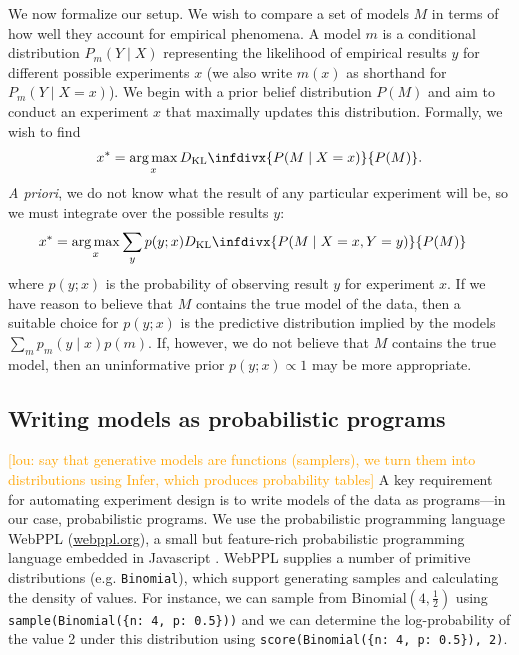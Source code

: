 \documentclass{article}
\newcommand{\dkl}{D_\mathrm{KL}\infdivx}
\newcommand{\lou}[1]{\textcolor{orange}{[lou: #1]}}
\DeclareMathOperator*{\argmax}{arg\,max}
\begin{document}
We now formalize our setup.
We wish to compare a set of models $M$ in terms of how well they account for empirical phenomena.
A model $m$ is a conditional distribution $P_m(Y \mid X)$ representing the likelihood of empirical results $y$ for different possible experiments $x$ (we also write $m(x)$ as shorthand for $P_m(Y \mid X = x)$).
We begin with a prior belief distribution $P(M)$ and aim to conduct an experiment $x$ that maximally updates this distribution.
Formally, we wish to find
$$x^{*} = \argmax_{x} \dkl{ P(M \mid X = x) }{ P(M) }.$$
\emph{A priori}, we do not know what the result of any particular experiment will be, so we must integrate over the possible results $y$:
\begin{align}
  x^{*} &= \argmax_{x} \sum\limits_{y}p(y ; x) \dkl{ P(M \mid X = x, Y = y) }{ P(M) }  \label{eq:oed}
\end{align}
where $p(y ; x)$ is the probability of observing result $y$ for experiment $x$.
If we have reason to believe that $M$ contains the true model of the data, then a suitable choice for $p(y ; x)$ is the predictive distribution implied by the models $ \sum\limits_{m}p_m(y \mid x)p(m) $.
If, however, we do not believe that $M$ contains the true model, then an uninformative prior $p(y ; x) \propto 1$ may be more appropriate.

\subsection{Writing models as probabilistic programs}

\lou{say that generative models are functions (samplers), we turn them into distributions using Infer, which produces probability tables}
A key requirement for automating experiment design is to write models of the data as programs---in our case, probabilistic programs.
We use the probabilistic programming language WebPPL (\url{webppl.org}), a small but feature-rich probabilistic programming language embedded in Javascript \cite{dippl}.
WebPPL supplies a number of primitive distributions (e.g. \lstinline{Binomial}), which  support generating samples and calculating the density of values.
For instance, we can sample from $\text{Binomial}(4, \frac{1}{2})$ using \lstinline|sample(Binomial({n: 4, p: 0.5}))| and we can determine the log-probability of the value 2 under this distribution using \lstinline|score(Binomial({n: 4, p: 0.5}), 2)|.
\end{document}
